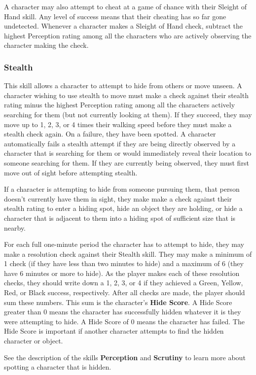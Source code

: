 \documentclass[oneside]{book}
\begin{document}
\begin{multicols}{2}
A character may also attempt to cheat at a game of chance with their Sleight of Hand skill. Any level of success means that their cheating has so far gone undetected. 
Whenever a character makes a Sleight of Hand check, subtract the highest Perception rating among all the characters who are actively observing the character making the check. 

\subsubsection{Stealth}
This skill allows a character to attempt to hide from others or move unseen. A character wishing to use stealth to move must make a check against their stealth rating minus the highest Perception rating among all the characters actively searching for them (but not currently looking at them). If they succeed, they may move up to 1, 2, 3, or 4 times their walking speed before they must make a stealth check again. On a failure, they have been spotted. A character automatically fails a stealth attempt if they are being directly observed by a character that is searching for them or would immediately reveal their location to someone searching for them. If they are currently being observed, they must first move out of sight before attempting stealth. 

If a character is attempting to hide from someone pursuing them, that person doesn't currently have them in sight, they make make a check against their stealth rating to enter a hiding spot, hide an object they are holding, or hide a character that is adjacent to them into a hiding spot of sufficient size that is nearby.

 For each full one-minute period the character has to attempt to hide, they may make a resolution check against their Stealth skill. They may make a minimum of 1 check (if they have less than two minutes to hide) and a maximum of 6 (they have 6 minutes or more to hide). As the player makes each of these resolution checks, they should write down a 1, 2, 3, or 4 if they achieved a Green, Yellow, Red, or Black success, respectively. After all checks are made, the player should sum these numbers. This sum is the character's \textbf{Hide Score}. A Hide Score greater than 0 means the character has successfully hidden whatever it is they were attempting to hide. A Hide Score of 0 means the character has failed. The Hide Score is important if another character attempts to find the hidden character or object.

See the description of the skills \textbf{Perception} and \textbf{Scrutiny} to learn more about spotting a character that is hidden. 


\end{multicols}
\end{document}
